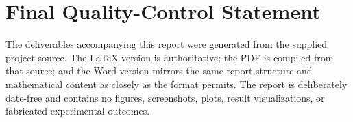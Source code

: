 \documentclass[11pt,a4paper]{article}
\begin{document}
\section{Final Quality-Control Statement}

The deliverables accompanying this report were generated from the supplied project source. The LaTeX version is authoritative; the PDF is compiled from that source; and the Word version mirrors the same report structure and mathematical content as closely as the format permits. The report is deliberately date-free and contains no figures, screenshots, plots, result visualizations, or fabricated experimental outcomes.
\end{document}
